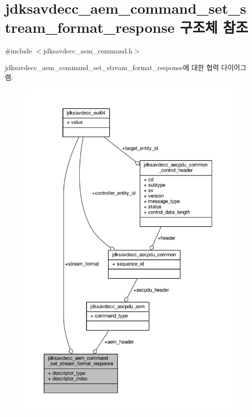 \hypertarget{structjdksavdecc__aem__command__set__stream__format__response}{}\section{jdksavdecc\+\_\+aem\+\_\+command\+\_\+set\+\_\+stream\+\_\+format\+\_\+response 구조체 참조}
\label{structjdksavdecc__aem__command__set__stream__format__response}


{\ttfamily \#include $<$jdksavdecc\+\_\+aem\+\_\+command.\+h$>$}



jdksavdecc\+\_\+aem\+\_\+command\+\_\+set\+\_\+stream\+\_\+format\+\_\+response에 대한 협력 다이어그램\+:
\nopagebreak
\begin{figure}[H]
\begin{center}
\leavevmode
\includegraphics[width=350pt]{structjdksavdecc__aem__command__set__stream__format__response__coll__graph}
\end{center}
\end{figure}
